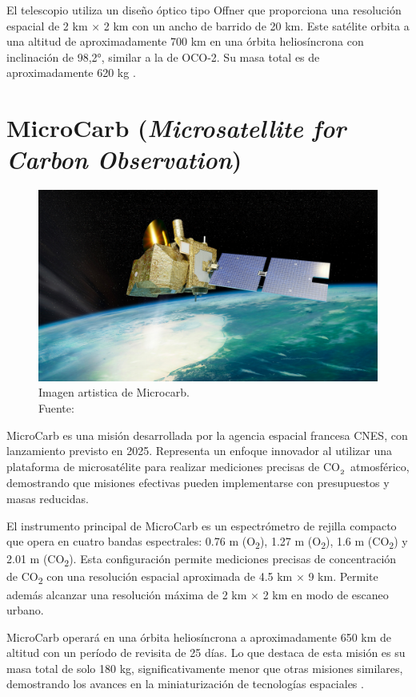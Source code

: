 El telescopio utiliza un diseño óptico tipo Offner que proporciona una resolución espacial de 2 km × 2 km con un ancho de barrido de 20 km. Este satélite orbita a una altitud de aproximadamente 700 km en una órbita heliosíncrona con inclinación de 98,2°, similar a la de OCO-2. Su masa total es de aproximadamente 620 kg \cite{eoportal_tansat}.

\section{MicroCarb (\textit{Microsatellite for Carbon Observation})}

\begin{figure}[H]
    \centering
    \includegraphics[width=0.8\linewidth]{2.Misiones_Semejantes/Microcarb_Airbus_Cnes_OliverSattler-1386146461.jpg}
    \caption{Imagen artistica de Microcarb. \\Fuente: \cite{futura_microcarb}
}
\end{figure}

MicroCarb es una misión desarrollada por la agencia espacial francesa CNES, con lanzamiento previsto en 2025. Representa un enfoque innovador al utilizar una plataforma de microsatélite para realizar mediciones precisas de CO$_\textsubscript{2}$ atmosférico, demostrando que misiones efectivas pueden implementarse con presupuestos y masas reducidas.

El instrumento principal de MicroCarb es un espectrómetro de rejilla compacto que opera en cuatro bandas espectrales: 0.76 \textmu m (O\textsubscript{2}), 1.27 \textmu m (O\textsubscript{2}), 1.6 \textmu m (CO\textsubscript{2}) y 2.01 \textmu m (CO\textsubscript{2}). Esta configuración permite mediciones precisas de concentración de CO\textsubscript{2} con una resolución espacial aproximada de 4.5 km × 9 km. Permite además alcanzar una resolución máxima de 2 km × 2 km en modo de escaneo urbano. 

MicroCarb operará en una órbita heliosíncrona a aproximadamente 650 km de altitud con un período de revisita de 25 días. Lo que destaca de esta misión es su masa total de solo 180 kg, significativamente menor que otras misiones similares, demostrando los avances en la miniaturización de tecnologías espaciales \cite{eoportal_microcarb}.

